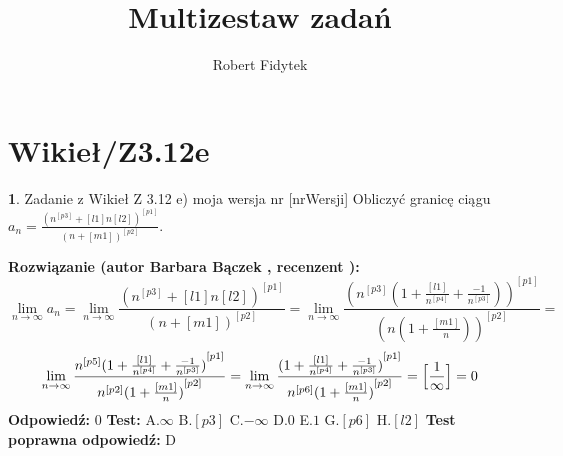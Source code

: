 \documentclass[12pt, a4paper]{article}
\title{Multizestaw zadań}
\author{Robert Fidytek}
\date{}
\theoremstyle{definition} %
\newtheorem{zad}{}
\newcommand{\kategoria}[1]{\section{#1}} %
\newcommand{\zadStart}[1]{\begin{zad}#1\newline} %
\newcommand{\zadStop}{\end{zad}}   %
\newcommand{\rozwStart}[2]{\noindent \textbf{Rozwiązanie (autor #1 , recenzent #2): }\newline} %
\newcommand{\rozwStop}{\newline}                                            %
\newcommand{\odpStart}{\noindent \textbf{Odpowiedź:}\newline}    %
\newcommand{\odpStop}{\newline}                                             %
\newcommand{\testStart}{\noindent \textbf{Test:}\newline} %
\newcommand{\testStop}{\newline} %
\newcommand{\kluczStart}{\noindent \textbf{Test poprawna odpowiedź:}\newline} %
\newcommand{\kluczStop}{\newline} %
\begin{document}
\maketitle


\kategoria{Wikieł/Z3.12e}
\zadStart{Zadanie z Wikieł Z 3.12 e) moja wersja nr [nrWersji]}
Obliczyć granicę ciągu $a_n=\frac{{(n^{[p3]} + [l1]n [l2])}^{[p1]}}{{(n+[m1])}^{[p2]}}$.
\zadStop
\rozwStart{Barbara Bączek}{}
$$\lim_{n \rightarrow \infty} a_n= \lim_{n \rightarrow \infty} \frac{{(n^{[p3]} + [l1]n [l2])}^{[p1]}}{{(n+[m1])}^{[p2]}}= \lim_{n \rightarrow \infty} \frac{{(n^{[p3]}(1+\frac{[l1]}{n^{[p4]}}+ \frac{-1}{n^{[p3]}}))}^{[p1]}}{{(n(1+ \frac{[m1]}{n}))}^{[p2]}} =$$
$$\lim_{n \rightarrow \infty} \frac{n^{[p5]}{(1+\frac{[l1]}{n^{[p4]}}+ \frac{-1}{n^{[p3]}})}^{[p1]}}{n^{[p2]}{(1+ \frac{[m1]}{n})}^{[p2]}}=\lim_{n \rightarrow \infty} \frac{{(1+\frac{[l1]}{n^{[p4]}}+ \frac{-1}{n^{[p3]}})}^{[p1]}}{n^{[p6]}{(1+ \frac{[m1]}{n})}^{[p2]}}= \Big{[}\frac{1}{\infty}\Big{]}=0$$ 
\rozwStop
\odpStart
$0$
\odpStop
\testStart
A.$\infty$
B.$[p3]$
C.$-\infty$
D.$0$
E.$1$
G.$[p6]$
H.$[l2]$
\testStop
\kluczStart
D
\kluczStop
\end{document}
